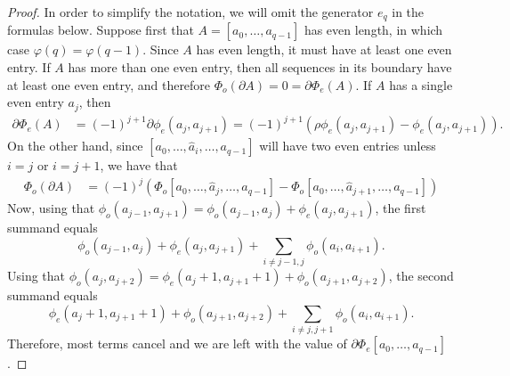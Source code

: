 \begin{proof} In order to simplify the notation, we will omit the generator $e_q$ in the formulas below.
	Suppose first that $A = [a_0,\ldots,a_{q-1}]$ has even length, in which case $\varphi(q) = \varphi(q-1)$. Since $A$ has even length, it must have at least one even entry. If $A$ has more than one even entry, then all sequences in its boundary have at least one even entry, and therefore $\Phi_o(\partial A) = 0 = \partial\Phi_e(A)$. If $A$ has a single even entry $a_j$, then
	\begin{align*}
		\partial \Phi_e(A) &= (-1)^{j+1}\partial \phi_e(a_j,a_{j+1}) = (-1)^{j+1}\left(\rho\phi_e(a_j,a_{j+1}
		) - \phi_e(a_j,a_{j+1})\right).
	\end{align*}
	On the other hand, since $[a_0,\ldots,\hat{a}_i,\ldots,a_{q-1}]$ will have two even entries unless $i=j$ or $i=j+1$, we have that
	\begin{align*}
		\Phi_o(\partial A)
		&= (-1)^{j}\left(\Phi_o [a_0,\ldots,\hat{a}_j,\ldots,a_{q-1}]-\Phi_o [a_0,\ldots,\hat{a}_{j+1},\ldots,a_{q-1}]\right)
	\end{align*}
	Now, using that $\phi_o(a_{j-1},a_{j+1}) = \phi_o(a_{j-1},a_j) + \phi_e(a_j,a_{j+1})$, the first summand equals
	\[
	\phi_o(a_{j-1},a_j) + \phi_e(a_j,a_{j+1})+\sum_{i\neq j-1,j} \phi_o(a_i,a_{i+1}).
	\]
	Using that $\phi_o(a_{j},a_{j+2}) = \phi_e(a_j+1,a_{j+1}+1)+\phi_o(a_{j+1},a_{j+2})$, the second summand equals
	\[
	\phi_e(a_j+1,a_{j+1}+1) + \phi_o(a_{j+1},a_{j+2})+\sum_{i\neq j,j+1} \phi_o(a_i,a_{i+1}).
	\]
	Therefore, most terms cancel and we are left with the value of $\partial \Phi_e[a_0,\ldots,a_{q-1}]$.


\end{proof}
